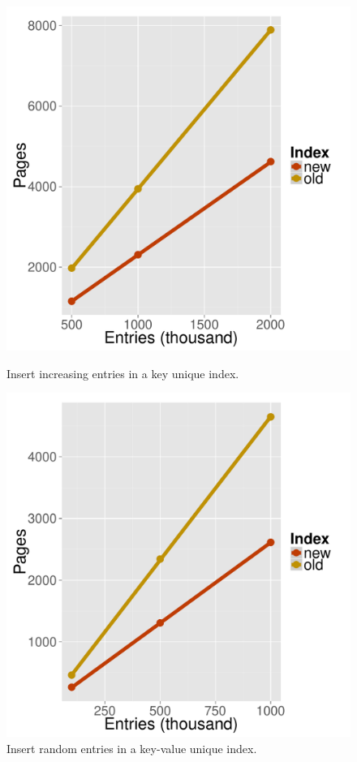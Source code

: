 \documentclass[11pt,a4paper,oneside]{article}
\begin{document}
\begin{figure}
{\begin{minipage}{0.3\textwidth}
      \includegraphics[scale=0.30]{images/unique_increasing_insert_numNodes.pdf} 
      \caption{Insert increasing entries in a key unique index.}
      \label{fig:unique_increasing_insert_numNodes}
      \end{minipage}
      \hspace{0.05\textwidth}
      \begin{minipage}{0.3\textwidth}
      \includegraphics[scale=0.30]{images/nonunique_random_insert_numNodes.pdf} 
      \caption{Insert random entries in a key-value unique index.}
      \label{fig:nonunique_random_insert_numNodes}
      \end{minipage}
    }
\end{figure}
\end{document}
